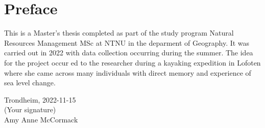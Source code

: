 


\section*{Preface}
This is a Master's thesis completed as part of the study program Natural Resources Management MSc at NTNU in the deparment of Geography. It was carried out in 2022 with data collection occurring during the summer. The idea for the project occur ed to the researcher during a kayaking expedition in Lofoten where she came across many individuals with direct memory and experience of sea level change. \\[2cm]

\begin{center}
Trondheim, 2022-11-15\\[1pc]

(Your signature)\\[1pc]
Amy Anne McCormack 
\end{center}
